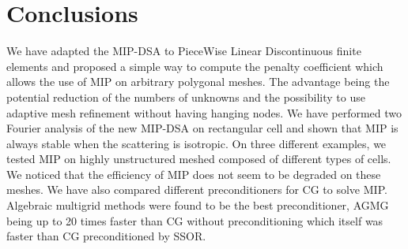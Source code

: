 \section{Conclusions} \label{sec_conc}
We have adapted the MIP-DSA to PieceWise Linear Discontinuous finite elements
and proposed a simple way to compute the penalty coefficient which allows the
use of MIP on arbitrary polygonal meshes. The advantage being the potential reduction 
of the numbers of unknowns and the possibility to use adaptive mesh refinement 
without having hanging nodes. We have performed two Fourier analysis of the
new MIP-DSA on rectangular cell and shown that MIP is always stable when the
scattering is isotropic. On three different examples, we tested MIP on highly
unstructured meshed composed of different types of cells. We noticed that the
efficiency of MIP does not seem to be degraded on these meshes. We have also
compared different preconditioners for CG to solve MIP. Algebraic multigrid
methods were found to be the best preconditioner, AGMG being up to 20 times
faster than CG without preconditioning which itself was faster than CG
preconditioned by SSOR.

